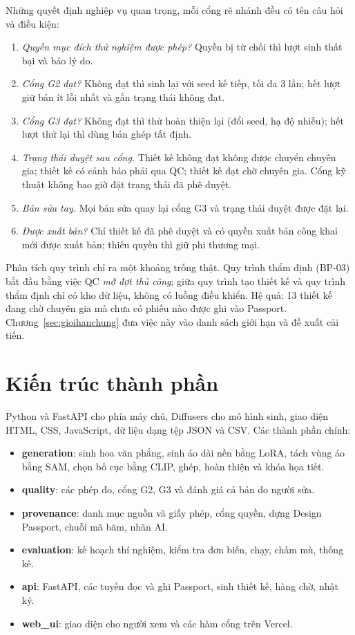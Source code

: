 \documentclass[12pt,a4paper]{report}
\begin{document}
Những quyết định nghiệp vụ quan trọng, mỗi cổng rẽ nhánh đều có tên câu hỏi và điều kiện:
\begin{enumerate}
  \item \emph{Quyền mục đích thử nghiệm được phép?} Quyền bị từ chối thì lượt sinh thất bại và báo lý do.
  \item \emph{Cổng G2 đạt?} Không đạt thì sinh lại với seed kế tiếp, tối đa 3 lần; hết lượt giữ bản ít lỗi nhất và gắn trạng thái không đạt.
  \item \emph{Cổng G3 đạt?} Không đạt thì thử hoàn thiện lại (đổi seed, hạ độ nhiễu); hết lượt thử lại thì dùng bản ghép tất định.
  \item \emph{Trạng thái duyệt sau cổng.} Thiết kế không đạt không được chuyển chuyên gia; thiết kế có cảnh báo phải qua QC; thiết kế đạt chờ chuyên gia. Cổng kỹ thuật không bao giờ đặt trạng thái đã phê duyệt.
  \item \emph{Bản sửa tay.} Mọi bản sửa quay lại cổng G3 và trạng thái duyệt được đặt lại.
  \item \emph{Được xuất bản?} Chỉ thiết kế đã phê duyệt và có quyền xuất bản công khai mới được xuất bản; thiếu quyền thì giữ phi thương mại.
\end{enumerate}

Phân tích quy trình chỉ ra một khoảng trống thật. Quy trình thẩm định (BP-03) bắt đầu bằng việc QC \emph{mở đợt thủ công}; giữa quy trình tạo thiết kế và quy trình thẩm định chỉ có kho dữ liệu, không có luồng điều khiển. Hệ quả: 13 thiết kế đang chờ chuyên gia mà chưa có phiếu nào được ghi vào Passport. Chương~\ref{sec:gioihanchung} đưa việc này vào danh sách giới hạn và đề xuất cải tiến.



\section{Kiến trúc thành phần}
\label{sec:component}

Python và FastAPI cho phía máy chủ, Diffusers cho mô hình sinh, giao diện HTML, CSS, JavaScript, dữ liệu dạng tệp JSON và CSV. Các thành phần chính:

\begin{itemize}
  \item \textbf{generation}: sinh hoa văn phẳng, sinh áo dài nền bằng LoRA, tách vùng áo bằng SAM, chọn bố cục bằng CLIP, ghép, hoàn thiện và khóa họa tiết.
  \item \textbf{quality}: các phép đo, cổng G2, G3 và đánh giá cả bản do người sửa.
  \item \textbf{provenance}: danh mục nguồn và giấy phép, cổng quyền, dựng Design Passport, chuỗi mã băm, nhãn AI.
  \item \textbf{evaluation}: kế hoạch thí nghiệm, kiểm tra đơn biến, chạy, chấm mù, thống kê.
  \item \textbf{api}: FastAPI, các tuyến đọc và ghi Passport, sinh thiết kế, hàng chờ, nhật ký.
  \item \textbf{web\_ui}: giao diện cho người xem và các hàm cổng trên Vercel.
\end{itemize}
\end{document}
